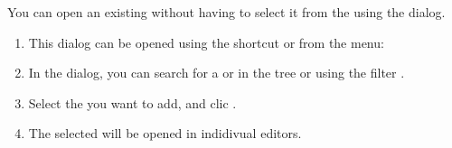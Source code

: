 You can open an existing \gdcase{} without having to select it from the \gdtestcasebrowser{} using the  dialog. 

\begin{enumerate}
\item  This dialog can be opened using the shortcut  or from the menu:\\
\item In the dialog, you can search for a \gdcase{} or \gdcases{} in the tree or using the filter . 
\item Select the \gdcases{} you want to add, and clic .
\item The selected \gdcases{} will be opened in indidivual \gdcase{} editors. 
\end{enumerate}

